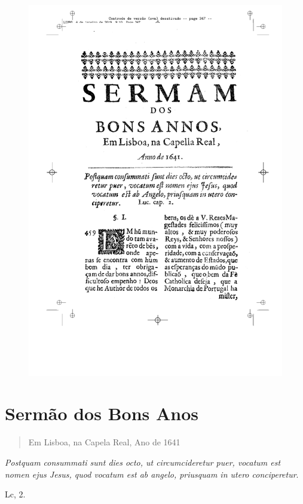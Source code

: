 \pagebreak
\thispagestyle{empty}
\movetoevenpage
\begin{figure}
\includegraphics[width=\textwidth]{./imgs/bonsanos.pdf}  
\end{figure}

\chapter{Sermão dos Bons Anos}

\begin{quotation}
\noindent{}Em Lisboa, na Capela Real, Ano de 1641
\end{quotation}

\epigraph{\emph{Postquam consummati sunt dies octo, ut circumcideretur puer,
vocatum est nomen ejus Jesus, quod vocatum est ab angelo, priusquam in
utero conciperetur}.\footnotemark}{Lc, 2.}

